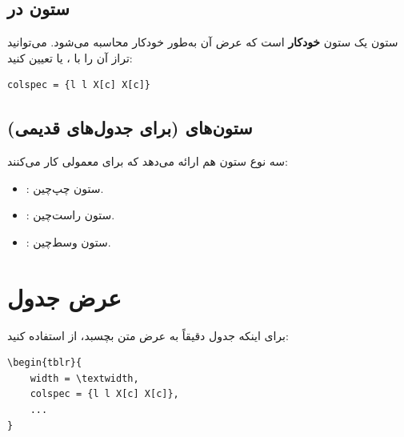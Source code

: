 \subsection{ستون  در }
\label{sec:tables-x-column}

ستون  یک ستون \textbf{خودکار} است که
عرض آن به‌طور خودکار محاسبه می‌شود. می‌توانید
تراز آن را با \lr{[c]}، \lr{[l]} یا \lr{[r]}
تعیین کنید:

\begin{latin}
\begin{verbatim}
colspec = {l l X[c] X[c]}
\end{verbatim}
\end{latin}


\subsection{ستون‌های  (برای جدول‌های قدیمی)}
\label{sec:tables-p-columns}

 سه نوع ستون  هم ارائه می‌دهد
که برای  معمولی کار می‌کنند:

\begin{itemize}
    \item {}: ستون چپ‌چین.
    \item {}: ستون راست‌چین.
    \item {}: ستون وسط‌چین.
\end{itemize}


\section{عرض جدول}
\label{sec:tables-width}

برای اینکه جدول دقیقاً به عرض متن بچسبد، از
 استفاده
کنید:

\begin{latin}
\begin{verbatim}
\begin{tblr}{
    width = \textwidth,
    colspec = {l l X[c] X[c]},
    ...
}
\end{verbatim}
\end{latin}

